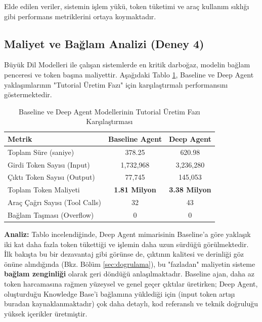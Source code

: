 Elde edilen veriler, sistemin işlem yükü, token tüketimi ve araç kullanım sıklığı gibi performans metriklerini ortaya koymaktadır.

\subsection{Maliyet ve Bağlam Analizi (Deney 4)}

Büyük Dil Modelleri ile çalışan sistemlerde en kritik darboğaz, modelin bağlam penceresi ve token başına maliyettir. Aşağıdaki Tablo \ref{tab:cost-context}, Baseline ve Deep Agent yaklaşımlarının "Tutorial Üretim Fazı" için karşılaştırmalı performansını göstermektedir.

\begin{table}[htbp]
    \centering
    \caption{Baseline ve Deep Agent Modellerinin Tutorial Üretim Fazı Karşılaştırması}
    \label{tab:cost-context}
    \begin{tabular}{|l|c|c|}
        \hline
        \textbf{Metrik} & \textbf{Baseline Agent} & \textbf{Deep Agent} \\
        \hline
        Toplam Süre (saniye) & 378.25 & 620.98 \\
        \hline
        Girdi Token Sayısı (Input) & 1,732,968 & 3,236,280 \\
        \hline
        Çıktı Token Sayısı (Output) & 77,745 & 145,053 \\
        \hline
        Toplam Token Maliyeti & \textbf{1.81 Milyon} & \textbf{3.38 Milyon} \\
        \hline
        Araç Çağrı Sayısı (Tool Calls) & 32 & 43 \\
        \hline
        Bağlam Taşması (Overflow) & 0 & 0 \\
        \hline
    \end{tabular}
\end{table}

\noindent\textbf{Analiz:}
Tablo incelendiğinde, Deep Agent mimarisinin Baseline'a göre yaklaşık iki kat daha fazla token tükettiği ve işlemin daha uzun sürdüğü görülmektedir. İlk bakışta bu bir dezavantaj gibi görünse de, çıktının kalitesi ve derinliği göz önüne alındığında (Bkz. Bölüm \ref{sec:dogrulama}), bu "fazladan" maliyetin sisteme \textbf{bağlam zenginliği} olarak geri döndüğü anlaşılmaktadır. Baseline ajan, daha az token harcamasına rağmen yüzeysel ve genel geçer çıktılar üretirken; Deep Agent, oluşturduğu Knowledge Base'i bağlamına yüklediği için (input token artışı buradan kaynaklanmaktadır) çok daha detaylı, kod referanslı ve teknik doğruluğu yüksek içerikler üretmiştir.

